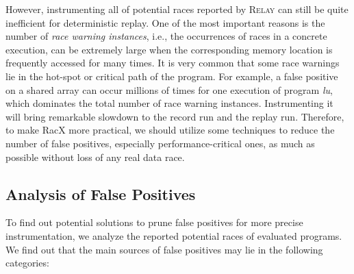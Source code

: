 \documentclass[10pt,onecolumn,letterpaper]{article}
\begin{document}
However, instrumenting all of potential races reported by
R\textsc{elay} can still be quite inefficient for deterministic
replay. One of the most important reasons is the number of
\emph{race warning instances}, i.e., the occurrences of races in a
concrete execution, can be extremely large when the corresponding
memory location is frequently accessed for many times. It is very
common that some race warnings lie in the hot-spot or critical path
of the program. For example, a false positive on a shared array can
occur millions of times for one execution of program \emph{lu},
which dominates the total number of race warning instances.
Instrumenting it will bring remarkable slowdown to the record run
and the replay run. Therefore, to make RacX more practical, we
should utilize some techniques to reduce the number of false
positives, especially performance-critical ones, as much as possible
without loss of any real data race.




\begin{table}[tb]
\caption{Insight of Race Warnings Reported By R\textsc{elay}
}\label{tab:warnings}
\end{table}

\subsection{Analysis of False Positives}
To find out potential solutions to prune false positives for more
precise instrumentation, we analyze the reported potential races of
evaluated programs. We find out that the main sources of false
positives may lie in the following categories:
\end{document}
